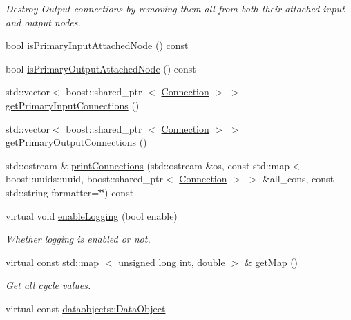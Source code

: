 \begin{DoxyCompactItemize}
\begin{DoxyCompactList}\small\item\em \-Destroy \-Output connections by removing them all from both their attached input and output nodes. \end{DoxyCompactList}\item 
bool \hyperlink{classcryomesh_1_1components_1_1Node_a2f55aa5adcac4a2f1aa1f0a7c8fc697d}{is\-Primary\-Input\-Attached\-Node} () const 
\item 
bool \hyperlink{classcryomesh_1_1components_1_1Node_a8466a252c7a4e6fb2d825826be53e218}{is\-Primary\-Output\-Attached\-Node} () const 
\item 
std\-::vector$<$ boost\-::shared\-\_\-ptr\*
$<$ \hyperlink{classcryomesh_1_1components_1_1Connection}{\-Connection} $>$ $>$ \hyperlink{classcryomesh_1_1components_1_1Node_a0f172d0f98de3d008d2d0a5efa15d3b2}{get\-Primary\-Input\-Connections} ()
\item 
std\-::vector$<$ boost\-::shared\-\_\-ptr\*
$<$ \hyperlink{classcryomesh_1_1components_1_1Connection}{\-Connection} $>$ $>$ \hyperlink{classcryomesh_1_1components_1_1Node_aa0ac6ca5e0d98261840760bdc07e4d3f}{get\-Primary\-Output\-Connections} ()
\item 
std\-::ostream \& \hyperlink{classcryomesh_1_1components_1_1Node_a036878d7028df14d1015c0ce413d4038}{print\-Connections} (std\-::ostream \&os, const std\-::map$<$ boost\-::uuids\-::uuid, boost\-::shared\-\_\-ptr$<$ \hyperlink{classcryomesh_1_1components_1_1Connection}{\-Connection} $>$ $>$ \&all\-\_\-cons, const std\-::string formatter=\char`\"{}\char`\"{}) const 
\item 
virtual void \hyperlink{classcryomesh_1_1dataobjects_1_1DataObjectController_a3e510413675407ec0a6745345ca9a3a8}{enable\-Logging} (bool enable)
\begin{DoxyCompactList}\small\item\em \-Whether logging is enabled or not. \end{DoxyCompactList}\item 
virtual const std\-::map\*
$<$ unsigned long int, double $>$ \& \hyperlink{classcryomesh_1_1dataobjects_1_1DataObjectController_a70a03ee28392ecf2e039702a18511f05}{get\-Map} ()
\begin{DoxyCompactList}\small\item\em \-Get all cycle values. \end{DoxyCompactList}\item 
virtual const \*
\hyperlink{classcryomesh_1_1dataobjects_1_1DataObject}{dataobjects\-::\-Data\-Object}\*

\end{DoxyCompactItemize}
